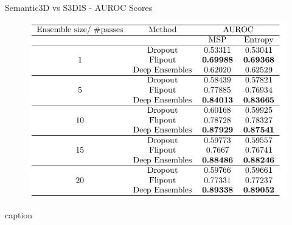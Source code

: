 \documentclass[aspectratio=169]{beamer}
\begin{document}
\begin{frame}{Semantic3D vs S3DIS - AUROC Scores}
            \begin{figure}
                \centering
                \includegraphics[scale=.35]{images/ood1/AUROC_OOD1_Scores.jpg}
            \end{figure}   
            \begin{table}
                \caption{caption}
            \end{table}
\end{frame}
\end{document}
